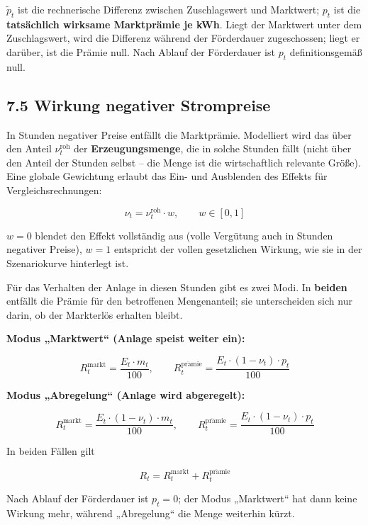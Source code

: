 \documentclass[
  a4paper,
  10pt]{article}
\begin{document}
\(\widetilde{p}_t\) ist die rechnerische Differenz zwischen
Zuschlagswert und Marktwert; \(p_t\) ist die \textbf{tatsächlich
wirksame Marktprämie je kWh}. Liegt der Marktwert unter dem
Zuschlagswert, wird die Differenz während der Förderdauer zugeschossen;
liegt er darüber, ist die Prämie null. Nach Ablauf der Förderdauer ist
\(p_t\) definitionsgemäß null.

\hypertarget{wirkung-negativer-strompreise}{%
\subsection{7.5 Wirkung negativer
Strompreise}\label{wirkung-negativer-strompreise}}

In Stunden negativer Preise entfällt die Marktprämie. Modelliert wird
das über den Anteil \(\nu^{\mathrm{roh}}_t\) der
\textbf{Erzeugungsmenge}, die in solche Stunden fällt (nicht über den
Anteil der Stunden selbst -- die Menge ist die wirtschaftlich relevante
Größe). Eine globale Gewichtung erlaubt das Ein- und Ausblenden des
Effekts für Vergleichsrechnungen:

\[ \nu_t = \nu^{\mathrm{roh}}_t \cdot w, \qquad w \in [0,1] \]

\(w = 0\) blendet den Effekt vollständig aus (volle Vergütung auch in
Stunden negativer Preise), \(w = 1\) entspricht der vollen gesetzlichen
Wirkung, wie sie in der Szenariokurve hinterlegt ist.

Für das Verhalten der Anlage in diesen Stunden gibt es zwei Modi. In
\textbf{beiden} entfällt die Prämie für den betroffenen Mengenanteil;
sie unterscheiden sich nur darin, ob der Markterlös erhalten bleibt.

\textbf{Modus „Marktwert`` (Anlage speist weiter ein):}

\[ R^{\mathrm{markt}}_t = \frac{E_t \cdot m_t}{100}, \qquad R^{\mathrm{pr\ddot{a}mie}}_t = \frac{E_t \cdot (1 - \nu_t) \cdot p_t}{100} \]

\textbf{Modus „Abregelung`` (Anlage wird abgeregelt):}

\[ R^{\mathrm{markt}}_t = \frac{E_t \cdot (1 - \nu_t) \cdot m_t}{100}, \qquad R^{\mathrm{pr\ddot{a}mie}}_t = \frac{E_t \cdot (1 - \nu_t) \cdot p_t}{100} \]

In beiden Fällen gilt

\[ R_t = R^{\mathrm{markt}}_t + R^{\mathrm{pr\ddot{a}mie}}_t \]

Nach Ablauf der Förderdauer ist \(p_t = 0\); der Modus „Marktwert`` hat
dann keine Wirkung mehr, während „Abregelung`` die Menge weiterhin
kürzt.
\end{document}
